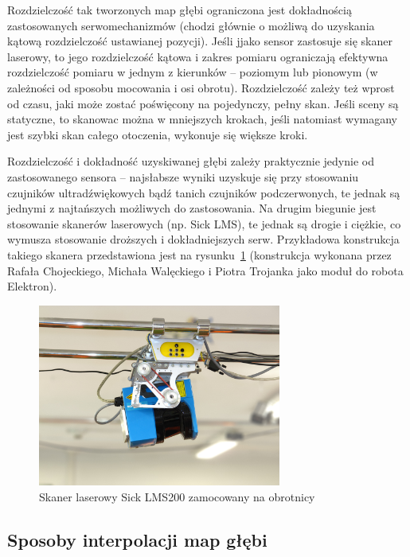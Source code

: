Rozdzielczość tak tworzonych map głębi ograniczona jest dokładnością
zastosowanych serwomechanizmów (chodzi głównie o możliwą do uzyskania
kątową rozdzielczość ustawianej pozycji). Jeśli jjako sensor zastosuje się
skaner laserowy, to jego rozdzielczość kątowa i zakres pomiaru ograniczają
efektywna rozdzielczość pomiaru w jednym z kierunków -- poziomym lub pionowym
(w zależności od sposobu mocowania i osi obrotu). Rozdzielczość zależy też
wprost od czasu, jaki może zostać poświęcony na pojedynczy, pełny skan. Jeśli
sceny są statyczne, to skanowac można w mniejszych krokach, jeśli natomiast
wymagany jest szybki skan całego otoczenia, wykonuje się większe kroki.

Rozdzielczość i dokładność uzyskiwanej głębi zależy praktycznie jedynie od
zastosowanego sensora -- najsłabsze wyniki uzyskuje się przy stosowaniu
czujników ultradźwiękowych bądź tanich czujników podczerwonych, te jednak są
jednymi z najtańszych możliwych do zastosowania. Na drugim biegunie jest
stosowanie skanerów laserowych (np. Sick LMS), te jednak są drogie i ciężkie, co
wymusza stosowanie droższych i dokładniejszych serw. Przykładowa konstrukcja
takiego skanera przedstawiona jest na rysunku~\ref{fig:sick_obrotnica}
(konstrukcja wykonana przez Rafała Chojeckiego, Michała Walęckiego i Piotra
Trojanka jako moduł do robota Elektron).

\begin{figure}[h!]
\centering
\includegraphics[height=6cm]{../../Common/img/sick_obrotnica}
\caption{Skaner laserowy Sick LMS200 zamocowany na obrotnicy}
\label{fig:sick_obrotnica}
\end{figure}

\subsection{Sposoby interpolacji map głębi}

